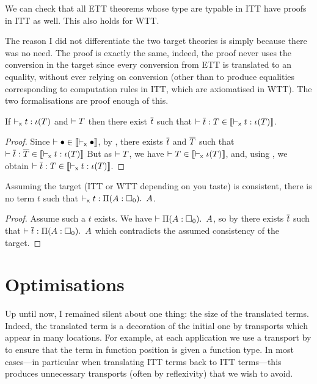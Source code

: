 We can check that all \acrshort{ETT} theorems whose type are typable in
\acrshort{ITT} have proofs in \acrshort{ITT} as well.
This also holds for \acrshort{WTT}.

The reason I did not differentiate the two target theories is simply because
there was no need. The proof is exactly the same, indeed, the proof never uses
the conversion in the target since every conversion from \acrshort{ETT} is
translated to an equality, without ever relying on conversion (other than to
produce equalities corresponding to computation rules in \acrshort{ITT}, which
are axiomatised in \acrshort{WTT}).
The two formalisations are proof enough of this.

\begin{corollary}[Conservativity]
  If $\vdash_{\mathsf{x}} t : \iota(T)$ and $\vdash T$ then there exist $\overline{t}$ such
  that $\vdash \overline{t} : T \in \llbracket \vdash_{\mathsf{x}} t : \iota(T) \rrbracket$.
\end{corollary}

\begin{proof}
  Since $\vdash \bullet \in \llbracket \vdash_{\mathsf{x}} \bullet \rrbracket$, by
  , there exists $\overline{t}$ and $\overline{T}$ such that
  $\vdash \overline{t} : \overline{T} \in \llbracket \vdash_{\mathsf{x}} t : \iota(T) \rrbracket$
  But as $\vdash T$, we have
  $\vdash T \in \llbracket \vdash_{\mathsf{x}} \iota(T) \rrbracket$, and,
  using , we obtain
  $\vdash \overline{t} : T \in \llbracket \vdash_{\mathsf{x}} t : \iota(T) \rrbracket$.
\end{proof}

\begin{corollary}
  Assuming the target (\acrshort{ITT} or \acrshort{WTT} depending on you taste)
  is consistent, there is no term $t$ such that
  $\vdash_{\mathsf{x}} t : \mathop{\Pi(A:\square_{0}).\ }{A}$.
\end{corollary}

\begin{proof}
  Assume such a $t$ exists.
  We have $\vdash \mathop{\Pi(A:\square_{0}).\ }{A}$, so by 
  there exists $\overline{t}$ such that $\vdash \overline{t} : \mathop{\Pi(A:\square_{0}).\ }{A}$ which
  contradicts the assumed consistency of the target.
\end{proof}

\section{Optimisations}

Up until now, I remained silent about one thing: the size of the
translated terms. Indeed, the translated term is a decoration of the
initial one by transports which appear in many locations. For example,
at each application we use a transport by  to
ensure that the term in function position is given a function type. In
most cases---in particular when translating \acrshort{ITT} terms back to
\acrshort{ITT} terms---this produces unnecessary transports (often by
reflexivity) that we wish to avoid.

